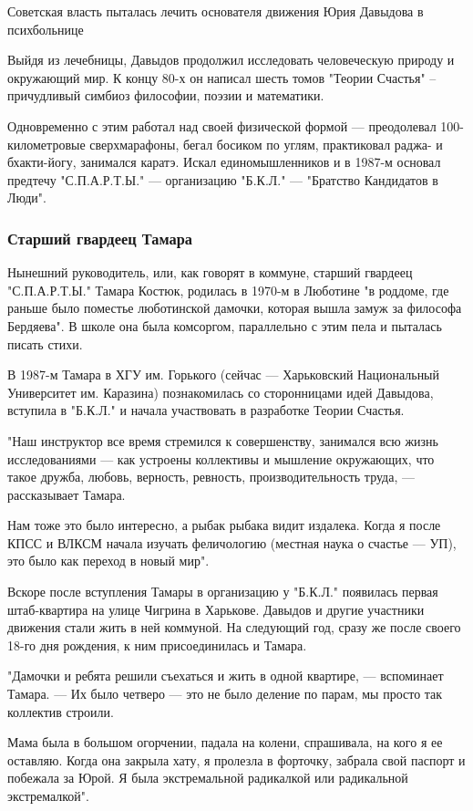 \documentclass[a4paper,11pt]{extreport}
\begin{document}
Советская власть пыталась лечить основателя движения Юрия Давыдова в психбольнице

Выйдя из лечебницы, Давыдов продолжил исследовать человеческую природу и
окружающий мир. К концу 80-х он написал шесть томов "Теории Счастья" –
причудливый симбиоз философии, поэзии и математики. 

Одновременно с этим работал над своей физической формой --- преодолевал
100-километровые сверхмарафоны, бегал босиком по углям, практиковал раджа- и
бхакти-йогу, занимался каратэ. Искал единомышленников и в 1987-м основал
предтечу "С.П.А.Р.Т.Ы." --- организацию "Б.К.Л." --- "Братство Кандидатов в Люди".

\subsubsection{Старший гвардеец Тамара}

Нынешний руководитель, или, как говорят в коммуне, старший гвардеец
"С.П.А.Р.Т.Ы." Тамара Костюк, родилась в 1970-м в Люботине "в роддоме, где
раньше было поместье люботинской дамочки, которая вышла замуж за философа
Бердяева". В школе она была комсоргом, параллельно с этим пела и пыталась
писать стихи.

В 1987-м Тамара в ХГУ им. Горького (сейчас --- Харьковский Национальный
Университет им. Каразина) познакомилась со сторонницами идей Давыдова, вступила
в "Б.К.Л." и начала участвовать в разработке Теории Счастья.

"Наш инструктор все время стремился к совершенству, занимался всю жизнь
исследованиями --- как устроены коллективы и мышление окружающих, что такое
дружба, любовь, верность, ревность, производительность труда, --- рассказывает
Тамара.

Нам тоже это было интересно, а рыбак рыбака видит издалека. Когда я после КПСС
и ВЛКСМ начала изучать феличологию (местная наука о счастье --- УП), это было как
переход в новый мир".

Вскоре после вступления Тамары в организацию у "Б.К.Л." появилась первая
штаб-квартира на улице Чигрина в Харькове. Давыдов и другие участники движения
стали жить в ней коммуной. На следующий год, сразу же после своего 18-го дня
рождения, к ним присоединилась и Тамара.

"Дамочки и ребята решили съехаться и жить в одной квартире, --- вспоминает
Тамара. --- Их было четверо --- это не было деление по парам, мы просто так
коллектив строили. 

Мама была в большом огорчении, падала на колени, спрашивала, на кого я ее
оставляю. Когда она закрыла хату, я пролезла в форточку, забрала свой паспорт и
побежала за Юрой. Я была экстремальной радикалкой или радикальной
экстремалкой".
\end{document}

